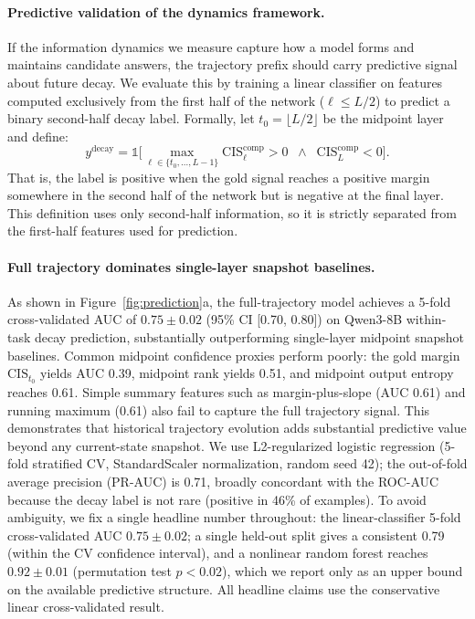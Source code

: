 \documentclass{article} %
\begin{document}
\paragraph{Predictive validation of the dynamics framework.}
If the information dynamics we measure capture how a model forms and maintains candidate answers, the trajectory prefix should carry predictive signal about future decay. We evaluate this by training a linear classifier on features computed exclusively from the first half of the network ($\ell \le L/2$) to predict a binary second-half decay label. Formally, let $t_0= \lfloor L/2 \rfloor$ be the midpoint layer and define:
\begin{equation}
y^{\mathrm{decay}} = \mathbb{1}\Big[\max_{\ell \in \{t_0,\ldots,L-1\}} \mathrm{CIS}^{\mathrm{comp}}_\ell > 0 \;\;\land\;\; \mathrm{CIS}^{\mathrm{comp}}_L < 0 \Big] .
\end{equation}
That is, the label is positive when the gold signal reaches a positive margin somewhere in the second half of the network but is negative at the final layer. This definition uses only second-half information, so it is strictly separated from the first-half features used for prediction.

\paragraph{Full trajectory dominates single-layer snapshot baselines.}
As shown in Figure~\ref{fig:prediction}a, the full-trajectory model achieves a 5-fold cross-validated AUC of $0.75 \pm 0.02$ (95\% CI [0.70, 0.80]) on Qwen3-8B within-task decay prediction, substantially outperforming single-layer midpoint snapshot baselines. Common midpoint confidence proxies perform poorly: the gold margin $\mathrm{CIS}_{t_0}$ yields AUC 0.39, midpoint rank yields 0.51, and midpoint output entropy reaches 0.61. Simple summary features such as margin-plus-slope (AUC 0.61) and running maximum (0.61) also fail to capture the full trajectory signal. This demonstrates that historical trajectory evolution adds substantial predictive value beyond any current-state snapshot. We use L2-regularized logistic regression (5-fold stratified CV, StandardScaler normalization, random seed 42); the out-of-fold average precision (PR-AUC) is 0.71, broadly concordant with the ROC-AUC because the decay label is not rare (positive in 46\% of examples). To avoid ambiguity, we fix a single headline number throughout: the linear-classifier 5-fold cross-validated AUC $0.75 \pm 0.02$; a single held-out split gives a consistent 0.79 (within the CV confidence interval), and a nonlinear random forest reaches $0.92 \pm 0.01$ (permutation test $p < 0.02$), which we report only as an upper bound on the available predictive structure. All headline claims use the conservative linear cross-validated result.
\end{document}
